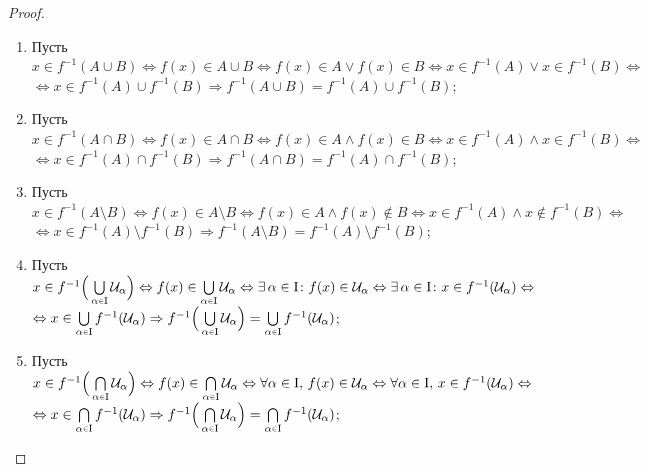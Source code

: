 \documentclass[12pt]{article}
\newcommand{\MI}{\mathrm{I}}
\newcommand{\MU}{\mathcal{U}}
\theoremstyle{definition}
\newcommand{\smallerrel}[1]{\mathrel{\mathpalette\smallerrelaux{#1}}}
\newcommand{\smallerrelaux}[2]{\raisebox{.1ex}{\scalebox{.75}{$#1#2$}}}
\newcommand{\smallin}{\smallerrel{\in}}
\begin{document}
\begin{proof}\hfill
	\begin{enumerate}[label ={(\arabic*)}]
		\item Пусть $x \in f^{-1}(A \cup B) \Leftrightarrow f(x) \in A \cup B \Leftrightarrow f(x) \in A \vee f(x) \in B \Leftrightarrow x \in f^{-1}(A) \vee x \in f^{-1}(B)\Leftrightarrow$\\  $\Leftrightarrow x \in  f^{-1}(A) \cup f^{-1}(B) \Rightarrow f^{-1}(A \cup B) = f^{-1}(A) \cup f^{-1}(B)$;
		\item Пусть $x \in f^{-1}(A \cap B) \Leftrightarrow f(x) \in A \cap B \Leftrightarrow f(x) \in A \wedge f(x) \in B \Leftrightarrow x \in f^{-1}(A) \wedge x \in f^{-1}(B)\Leftrightarrow$\\  $\Leftrightarrow x \in  f^{-1}(A) \cap f^{-1}(B) \Rightarrow f^{-1}(A \cap B) = f^{-1}(A) \cap f^{-1}(B)$;
		\item Пусть $x \in f^{-1}(A \setminus B) \Leftrightarrow f(x) \in A \setminus B \Leftrightarrow f(x) \in A \wedge f(x) \notin B \Leftrightarrow x \in f^{-1}(A)\wedge x \notin f^{-1}(B)\Leftrightarrow$\\ $\Leftrightarrow x \in f^{-1}(A) \setminus f^{-1}(B) \Rightarrow f^{-1}(A \setminus B) = f^{-1}(A) \setminus f^{-1}(B)$;
		\item Пусть $x \in f^{-1}\Big(\bigcup\limits_{\alpha \smallin \MI}\MU_\alpha\Big) \Leftrightarrow f(x) \in \bigcup\limits_{\alpha \smallin \MI}\MU_\alpha \Leftrightarrow \exists \, \alpha \in \MI \colon f(x) \in \MU_{\alpha} \Leftrightarrow \exists \, \alpha \in \MI \colon x \in f^{-1}(\MU_{\alpha}) \Leftrightarrow$\\
		$\Leftrightarrow x \in \textstyle \bigcup\limits_{\alpha \smallin \MI}f^{-1}(\MU_\alpha) \Rightarrow \textstyle f^{-1}\Big(\bigcup\limits_{\alpha \smallin \MI}\MU_\alpha\Big) = \textstyle \bigcup\limits_{\alpha \smallin \MI}f^{-1}(\MU_\alpha)$;
		\item Пусть $x \in f^{-1}\Big(\bigcap\limits_{\alpha \smallin \MI}\MU_\alpha\Big) \Leftrightarrow f(x) \in \bigcap\limits_{\alpha \smallin \MI}\MU_\alpha \Leftrightarrow \forall \alpha \in \MI,\, f(x) \in \MU_{\alpha} \Leftrightarrow \forall \alpha \in \MI,\, x \in f^{-1}(\MU_{\alpha}) \Leftrightarrow$\\
		$\Leftrightarrow x \in \textstyle \bigcap\limits_{\alpha \smallin \MI}f^{-1}(\MU_\alpha) \Rightarrow \textstyle f^{-1}\Big(\bigcap\limits_{\alpha \smallin \MI}\MU_\alpha\Big) = \textstyle \bigcap\limits_{\alpha \smallin \MI}f^{-1}(\MU_\alpha)$;
	\end{enumerate}
\end{proof}
\end{document}
